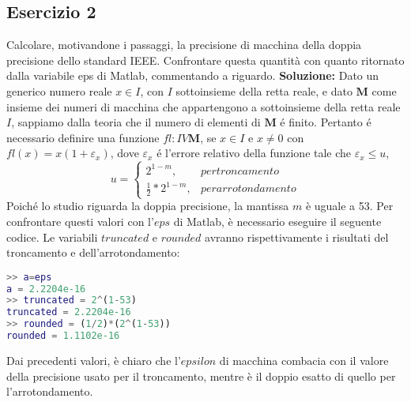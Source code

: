 \subsection{Esercizio 2}
Calcolare, motivandone i passaggi, la precisione di macchina della doppia precisione
dello standard IEEE. Confrontare questa quantità con quanto ritornato dalla variabile eps di
Matlab, commentando a riguardo.
\newline \textbf{Soluzione:} \newline
Dato un generico numero reale $x \in I$, con $I$ sottoinsieme della retta reale, e
dato $\mathbf{M}$ come insieme dei numeri di macchina che appartengono a sottoinsieme
della retta reale $I$, sappiamo dalla teoria che il numero di elementi di $\mathbf{M}$ é finito.
Pertanto é necessario definire una funzione $fl: I V \mathbf{M}$, se $x \in I$ e $x \neq 0$ con
$fl(x) = x(1 + \varepsilon_x)$, dove $\varepsilon_x$ é l'errore relativo della funzione tale che $\varepsilon_x \leq u$,
\begin{equation*}
    u =\begin{cases}
        2^{1-m},             & per troncamento    \\
        \frac{1}{2}*2^{1-m}, & per arrotondamento
    \end{cases}
\end{equation*}
Poiché lo studio riguarda la doppia precisione, la mantissa $m$ è uguale a 53.
Per confrontare questi valori con l'$eps$ di Matlab, è necessario eseguire il seguente codice.
Le variabili $truncated$ e $rounded$ avranno rispettivamente i risultati del troncamento e dell'arrotondamento:
\begin{lstlisting}[language=Matlab]
>> a=eps
a = 2.2204e-16
>> truncated = 2^(1-53)
truncated = 2.2204e-16
>> rounded = (1/2)*(2^(1-53))
rounded = 1.1102e-16
\end{lstlisting}
Dai precedenti valori, è chiaro che l'$epsilon$ di macchina combacia con il valore
della precisione usato per il troncamento, mentre è il doppio esatto di quello per
l'arrotondamento.
